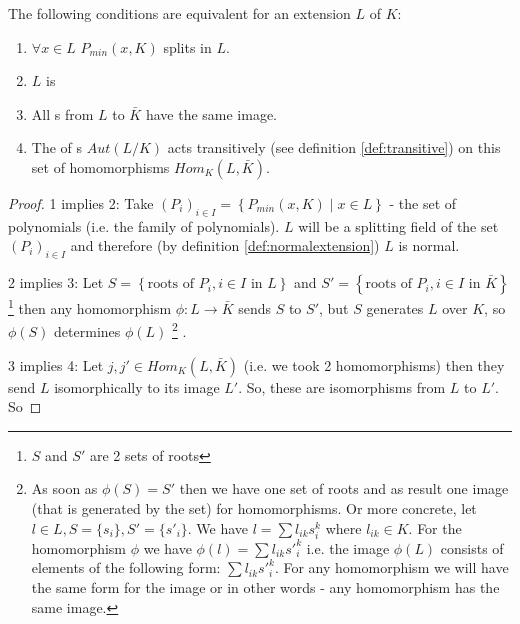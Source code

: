 \begin{theorem}
  The following conditions are equivalent for an extension $L$ of $K$:
  \begin{enumerate}
  \item $\forall x \in L$ $P_{min}\left(x, K\right)$ splits in $L$.
  \item $L$ is 
  \item All s from $L$ to $\bar{K}$ have the
    same image.
  \item The  of s
    $Aut\left(L/K\right)$ acts transitively (see definition
    \ref{def:transitive}) on this set of 
    homomorphisms $Hom_K\left(L, \bar{K}\right)$.
  \end{enumerate}
  \begin{proof}
    1 implies 2: Take
    $\left(P_i\right)_{i \in I} = \left\{P_{min}\left(x, K\right) \mid
    x \in L\right\}$ - the set of polynomials
    (i.e. the family of polynomials).
    $L$ will be a splitting field of the set $\left(P_i\right)_{i \in
      I}$ and therefore (by definition \ref{def:normalextension}) $L$ is normal.

    2 implies 3: Let
    $S = \left\{\mbox{roots of } P_i, i \in I \mbox{ in } L\right\}$
    and
    $S' = \left\{\mbox{roots of } P_i, i \in I \mbox{ in }
    \bar{K}\right\}$
    \footnote{
      $S$ and $S'$ are 2 sets of roots
    }
    then any homomorphism
    $\phi: L \to \bar{K}$ sends $S$ to $S'$, but $S$ generates $L$
    over $K$, so $\phi\left(S\right)$ determines $\phi\left(L\right)$
    \footnote{
      As soon as $\phi(S) = S'$ then we have one set of roots and as
      result one image (that is generated by the set) for
      homomorphisms. Or more concrete, let $l \in L, S = \{s_i\}, S' =
      \{s'_i\}$. We have $l = \sum l_{ik}s_i^k$ where $l_{ik} \in K$.
      For the homomorphism $\phi$ we have
      $\phi(l) = \sum l_{ik}{s'}_i^k$ i.e. the image $\phi(L)$ consists
      of elements of the following form: $\sum l_{ik}{s'}_i^k$. For any
      homomorphism we will have the same form for the image or in
      other words - any homomorphism has the same image.
    }
    .

    3 implies 4: Let $j, j' \in Hom_K\left(L, \bar{K}\right)$
    (i.e. we took 2 homomorphisms)
    then
    they send $L$ isomorphically to its image $L'$. So, these are
    isomorphisms from $L$ to $L'$. So

    

\end{proof}
\end{theorem}
